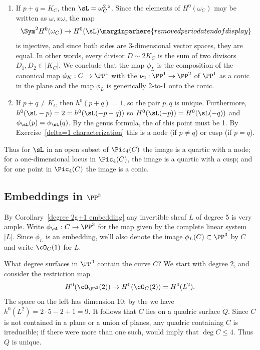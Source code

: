 \begin{enumerate}
\item If $p+q =  K_C$, then $\sL = \omega_C^2` `$. Since
the elements of $H^0(\omega_C)$ may be written as $\omega, x\omega$,
the map
$$
\Sym^2 H^0(\omega_C) \to H^0(\sL)
\marginparhere{removed period at end of display}
$$
 is injective, and since both sides are 3-dimensional vector spaces,
 they are equal. In other words, every divisor $D \sim 2K_C$ is the sum
 of two divisors $D_1, D_2 \in |K_C|$. We conclude that the map $\phi_L$
 is the composition of the canonical map $\phi_K : C \to \PP^1$ with the
%
 $\nu_2 : \PP^1 \to \PP^2$ of $\PP^1$ as a conic in
 the plane and the map $\phi_L$ is generically 2-to-1 onto the conic.

\item
\label{p+q not g12}
If $p+q \neq  K_C$  then $h^0(p+q) = 1$, so the pair $p,q$ is
unique. Furthermore,
 $h^0(\sL-p) = 2 =  h^0(\sL(-p-q))$ so
 $H^0(\sL(-p)) = H^0(\sL(-q))$ and $\phi_\sL(p) = \phi_\sL(q)$.
By the genus formula, the
%
of this point must be 1. By
Exercise~\ref{delta=1 characterization}
 this is a
node
%
(if $p\neq q$) or
cusp
%
%
(if $p=q$).
\end{enumerate}

Thus  for $\sL$ in an open subset of $\Pic_4(C)$ the image is a quartic
with a node; for a one-dimensional locus in $\Pic_4(C)$, the image is
a quartic with a cusp; and for one point in $\Pic_4(C)$ the image is
a conic.

\subsection*{Embeddings in $\PP^3$}

By Corollary~\ref{degree 2g+1 embedding} any invertible sheaf $L$ of
%
%
degree 5 is very ample.
Write $\phi_\sL : C \to \PP^3$
for the map given by the complete linear
system $|L|$. Since $\phi_L$ is an embedding, we'll also denote the
image $\phi_L(C) \subset \PP^3$ by $C$ and write $\cO_C(1)$ for $L$.

What degree surfaces in $\PP^3$ contain the curve $C$? We start with
degree 2, and consider the restriction map
$$
H^0(\cO_{\PP^3}(2)) \to H^0(\cO_C(2)) = H^0(L^2).
$$
The space on the left has dimension 10; by the
%
we have $h^0(L^2) = 2\cdot5 - 2 + 1 = 9$. It follows that $C$ lies
on a quadric surface $Q$. Since $C$ is not contained in a plane or a
union of planes, any quadric containing $C$ is irreducible; if there
were more than one such,
%
 would imply that $\deg C
\leq 4$. Thus $Q$ is unique.

